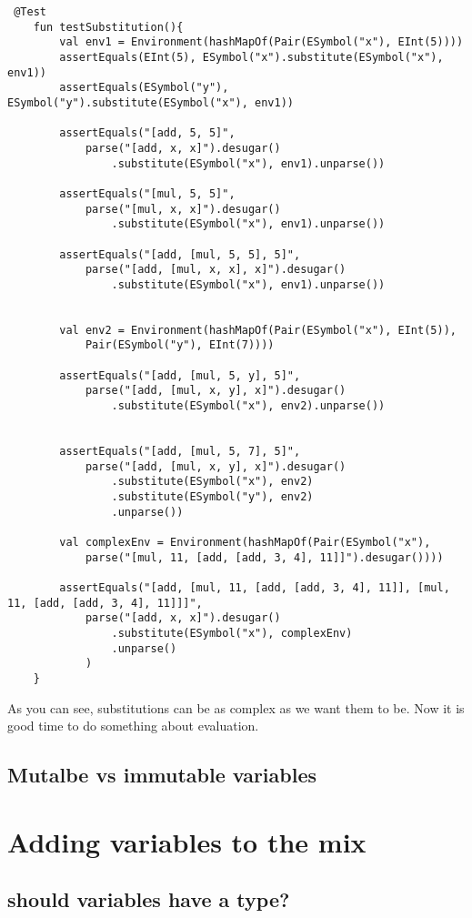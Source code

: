 \documentclass[11pt]{article}
\begin{document}
\begin{verbatim}
 @Test
    fun testSubstitution(){
        val env1 = Environment(hashMapOf(Pair(ESymbol("x"), EInt(5))))
        assertEquals(EInt(5), ESymbol("x").substitute(ESymbol("x"), env1))
        assertEquals(ESymbol("y"), ESymbol("y").substitute(ESymbol("x"), env1))

        assertEquals("[add, 5, 5]",
            parse("[add, x, x]").desugar()
                .substitute(ESymbol("x"), env1).unparse())

        assertEquals("[mul, 5, 5]",
            parse("[mul, x, x]").desugar()
                .substitute(ESymbol("x"), env1).unparse())

        assertEquals("[add, [mul, 5, 5], 5]",
            parse("[add, [mul, x, x], x]").desugar()
                .substitute(ESymbol("x"), env1).unparse())


        val env2 = Environment(hashMapOf(Pair(ESymbol("x"), EInt(5)),
            Pair(ESymbol("y"), EInt(7))))

        assertEquals("[add, [mul, 5, y], 5]",
            parse("[add, [mul, x, y], x]").desugar()
                .substitute(ESymbol("x"), env2).unparse())


        assertEquals("[add, [mul, 5, 7], 5]",
            parse("[add, [mul, x, y], x]").desugar()
                .substitute(ESymbol("x"), env2)
                .substitute(ESymbol("y"), env2)
                .unparse())

        val complexEnv = Environment(hashMapOf(Pair(ESymbol("x"),
            parse("[mul, 11, [add, [add, 3, 4], 11]]").desugar())))

        assertEquals("[add, [mul, 11, [add, [add, 3, 4], 11]], [mul, 11, [add, [add, 3, 4], 11]]]",
            parse("[add, x, x]").desugar()
                .substitute(ESymbol("x"), complexEnv)
                .unparse()
            )
    }
\end{verbatim}
As you can see, substitutions can be as complex as we want them to be.
Now it is good time to do something about evaluation.
\subsection{Mutalbe vs immutable variables}
\label{sec:orgb1ded87}
\section{Adding variables to the mix}
\label{sec:orgdd358c5}
\subsection{should variables have a type?}
\label{sec:org4c7e6cc}
\end{document}
